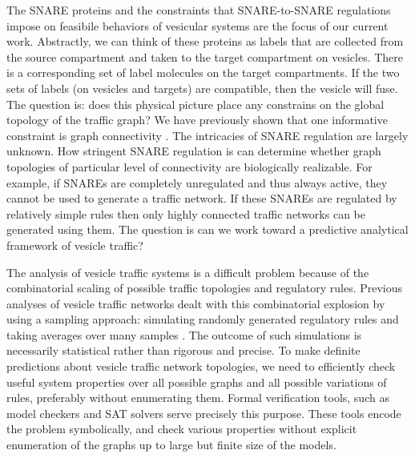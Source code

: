The SNARE proteins and the constraints that SNARE-to-SNARE regulations impose on feasibile behaviors of vesicular systems are the focus of our current work. Abstractly, we can think of these proteins as labels that are collected from the source compartment and taken to the target compartment on vesicles. There is a corresponding set of label molecules on the target compartments. If the two sets of labels (on vesicles and targets) are compatible, then the vesicle will fuse. The question is: does this physical picture place any constrains on the global topology of the traffic graph? We have previously shown that one informative constraint is graph connectivity \cite{shukla}.  The intricacies of SNARE regulation are largely unknown. How stringent SNARE regulation is can determine whether graph topologies of particular level of connectivity are biologically realizable.  For example, if SNAREs are completely unregulated and thus always active, they cannot be used to generate a traffic network. If these SNAREs are regulated by relatively simple rules then only highly connected traffic networks can be generated using them.   The question is can we work toward a predictive analytical framework of vesicle traffic?

The analysis of vesicle traffic systems is a difficult problem because of the combinatorial scaling of possible traffic topologies and regulatory rules.  Previous analyses of vesicle traffic networks dealt with this combinatorial explosion by using a sampling approach: simulating randomly generated regulatory rules and taking averages over many samples \cite{mani2016stacking}.  The outcome of such simulations is necessarily statistical rather than rigorous and precise. To make definite predictions about vesicle traffic network topologies, we need to efficiently check useful system properties over all possible graphs and all possible variations of rules, preferably without enumerating them.  Formal verification tools, such as model checkers \cite{clarke1996symbolic, biere2003bounded, clarke2008birth, cimatti2000nusmv, holzmann1997model} and SAT solvers \cite{moskewicz2001chaff,een2004extensible} serve precisely this purpose. These tools encode the problem symbolically, and check various properties without explicit enumeration of the graphs up to large but finite size of the models.

